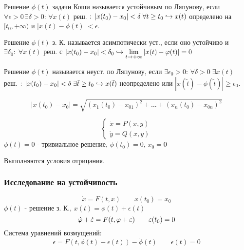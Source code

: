 \documentclass{article}
\begin{document}
\begin{definition}
Решение $\phi(t)$ задачи Коши называется устойчивым по Ляпунову,
если $\forall \epsilon >0 \, \exists \delta>0: \, \forall x(t)$ реш.
$: \, |x(t_0)-x_0|<\delta \; \forall t \ge t_0 \true x(t)$ определено на $[t_0, +\infty)$
и $|x(t)-\phi(t)|<\epsilon$.
\end{definition}
\begin{definition}
  Решение $\phi(t)$ з. К. называется асимпотически уст.,
  если оно устойчиво и $\exists \delta_0: \; \forall x(t)$ реш. с
  $|x(t_0)-x_0|<\delta_0 \true \lim \limits_{t \to +\infty} |x(t)-\phi(t)|=0$
\end{definition}
\begin{definition}[Неустойчивость]
  Решение $\phi(t)$ называется неуст. по Ляпунову,
  если $\exists \epsilon_0>0: \, \forall \delta>0 \; \exists x(t)$ реш.
  $: \, |x(t_0)-x_0|<\delta \; \exists \tilde{t} \ge t_0 \true x(\tilde{t})$
  неопределено или $|x(\tilde{t})-\phi(\tilde{t})|\ge \epsilon_0$.
\end{definition}
\begin{remark}
  \[
    |x(t_0)-x_0|=\sqrt{(x_1(t_0)-x_{01})^{2}+\dots +(x_n(t_0)-x_{0n})^{2}}
  \]
\end{remark}
\begin{eg}[889]
  \phantom{.}
 
  \[
    \left\{\begin{aligned}
      \dot{x}=P(x,y) \\ 
      \dot{y}=Q(x,y)
    \end{aligned}\right.
  \]
  $\phi(t)=0$ - тривиальное решение, $\phi(t_0)=0$, $x_0=0$

  Выполняются условия отрицания.
\end{eg}

\subsubsection{Исследование на устойчивость}
\[
  \dot{x}=F(t,x) \qquad x(t_0)=x_0
\] 
$\phi(t)$ - решение з. К., $x(t)=\phi(t)+\epsilon(t)$
\[
  \dot{\phi}+\dot{\epsilon}=F(t, \phi+\epsilon) \qquad \epsilon(t_0)=0 \\ 
\]
Система уравнений возмущений:
\[
\dot{\epsilon}=F(t,\phi(t)+\epsilon(t))-\dot{\phi}(t) \qquad \epsilon(t)=0
\]
\end{document}
